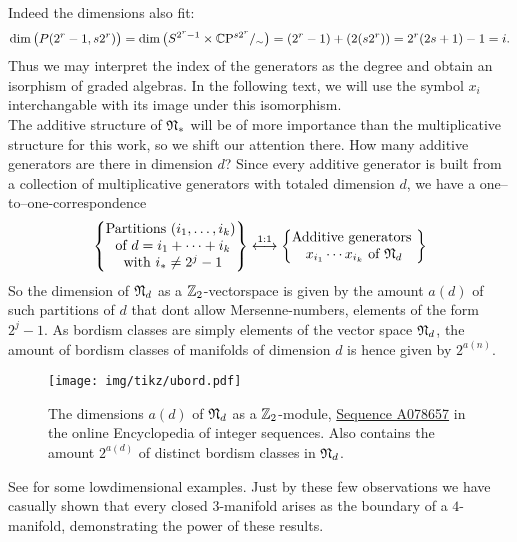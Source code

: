 Indeed the dimensions also fit:
\begin{equation*}
    \dim \big( P(2^r -1 , s2^r) \big) = \dim \big( S^{2^r -1} \times \mathbb{C}\mathrm{P}^{s2^r} /_\sim \big) = (2^r - 1) + (2(s2^r)) = 2^r(2s + 1) - 1 = i.
\end{equation*}
Thus we may interpret the index of the generators as the degree and obtain an isorphism of graded algebras. 
In the following text, we will use the symbol $x_i$ interchangable with its image under this isomorphism.\\
The additive structure of $\mathfrak{N}_\ast$ will be of more importance than the multiplicative structure for this work, so we shift our attention there.
How many additive generators are there in dimension $d$?
Since every additive generator is built from a collection of multiplicative generators with totaled dimension $d$, we have a one--to--one-correspondence
\begin{equation*}
    \begin{Bmatrix} \text{Partitions } (i_1, \dots ,i_k) \\ \text{ of } d = i_1 + \dots + i_k \\ \text{ with } i_\ast \neq 2^j - 1 \end{Bmatrix} \overset{1:1}{\longleftrightarrow}
    \begin{Bmatrix} \text{Additive generators } \\ x_{i_1} \cdots x_{i_k} \text{ of } \mathfrak{N}_d \end{Bmatrix}
\end{equation*}
So the dimension of $\mathfrak{N}_d$ as a $\mathbb{Z}_2$-vectorspace is given by the amount $a(d)$ of such partitions of $d$ that dont allow Mersenne-numbers, \ie elements of the form $2^j - 1$.
As bordism classes are simply elements of the vector space $\mathfrak{N}_d$, the amount of bordism classes of manifolds of dimension $d$ is hence given by $2^{a(n)}$.
\begin{figure}
    \centering
    \texttt{[image: img/tikz/ubord.pdf]}
    \caption{The dimensions $a(d)$ of $\mathfrak{N}_d$ as a $\mathbb{Z}_2$-module, \href{https://oeis.org/A078657}{Sequence A078657} in the online Encyclopedia of integer sequences. Also contains the amount $2^{a(d)}$ of distinct bordism classes in $\mathfrak{N}_d$.}\label{fig:ubord}
\end{figure}
See  for some lowdimensional examples.
Just by these few observations we have casually shown that every closed $3$-manifold arises as the boundary of a $4$-manifold, demonstrating the power of these results.\\
